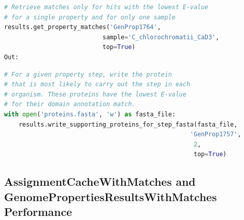 \begin{lstlisting}[language=Python]  
# Retrieve matches only for hits with the lowest E-value 
# for a single property and for only one sample                                     
results.get_property_matches('GenProp1764', 
                           sample='C_chlorochromatii_CaD3',
                           top=True)
Out:
\end{lstlisting}

\begin{table}[!ht]
\centering
{}
\end{table}

\begin{lstlisting}[language=Python]  
# For a given property step, write the protein 
# that is most likely to carry out the step in each 
# organism. These proteins have the lowest E-value
# for their domain annotation match.                                 
with open('proteins.fasta', 'w') as fasta_file:
    results.write_supporting_proteins_for_step_fasta(fasta_file, 
                                                   'GenProp1757', 
                                                    2, 
                                                    top=True)
\end{lstlisting}

\subsection{AssignmentCacheWithMatches and GenomePropertiesResultsWithMatches Performance} \label{matches-performance}

